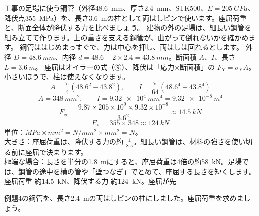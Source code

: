 \begin{phreidai}
\label{ph:力-11:ex4}工事の足場に使う鋼管（外径\qty{48.6}{mm}、厚さ\qty{2.4}{mm}、STK500、$E=\qty{205}{GPa}$、降伏点\qty{355}{MPa}）を、長さ\qty{3.6}{m}の柱として両はしピンで使います。座屈荷重と、断面全体が降伏する力を比べましょう。
\phbamen
建物の外の足場は、細長い鋼管を組み立てて作ります。上の重さを支える鋼管が、曲がって倒れないかを確かめます。
\phmushi
鋼管ははじめまっすぐで、力は中心を押し、両はしは回れるとします。
\phzu
外径 $D=\qty{48.6}{mm}$、内径 $d=48.6-2\times2.4=\qty{43.8}{mm}$。断面積 $A$、$I$、長さ $L=\qty{3.6}{m}$。
\phriyu
座屈はオイラーの式（⑨）、降伏は「応力×断面積」の $F_{\mathrm Y}=\sigma_{\mathrm Y}A$。小さいほうで、柱は使えなくなります。
\phtateru
\[ A=\frac{\pi}{4}(48.6^2-43.8^2),\qquad I=\frac{\pi}{64}(48.6^4-43.8^4) \]
\phtoku
\[ A=\qty{348}{mm^2},\qquad I=\qty{9.32e4}{mm^4}=\qty{9.32e-8}{m^4} \]
\[ F_{\mathrm{cr}}=\frac{9.87\times205\times10^9\times9.32\times10^{-8}}{3.6^2}\approx\qty{14.5}{kN} \]
\[ F_{\mathrm Y}=355\times348\approx\qty{124}{kN} \]
\phtashikame
単位：$\unit{MPa}\times\unit{mm^2}=\unit{N/mm^2}\times\unit{mm^2}=\unit{N}$。\\
大きさ：座屈荷重は、降伏する力の約 $\tfrac{1}{8.5}$。細長い鋼管は、材料の強さを使い切る前に座屈で決まります。\\
極端な場合：長さを半分の\qty{1.8}{m}にすると、座屈荷重は4倍の約\qty{58}{kN}。足場では、鋼管の途中を横の管や「壁つなぎ」でとめて、座屈する長さを短くします。
\kotae 座屈荷重 約\qty{14.5}{kN}、降伏する力 約\qty{124}{kN}。座屈が先
\end{phreidai}
\begin{jibun}
例題4の鋼管を、長さ\qty{2.4}{m}の両はしピンの柱にしました。座屈荷重を求めましょう。
\end{jibun}


